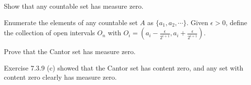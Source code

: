 \begin{exercise}
Show that any countable set has measure zero.
\end{exercise}
\begin{solution}
Enumerate the elements of any countable set \(A\) as \(\{a_1, a_2, \cdots\}\). Given \(\epsilon > 0\), define the collection of open intervals \(O_n\) with \(O_i = (a_i - \frac{\epsilon}{2^{i + 1}}, a_i + \frac{\epsilon}{2^{i+1}})\).
\end{solution}

\begin{exercise}
Prove that the Cantor set has measure zero.
\end{exercise}

\begin{solution}
Exercise 7.3.9 (c) showed that the Cantor set has content zero, and any set with content zero clearly has measure zero.
\end{solution}
